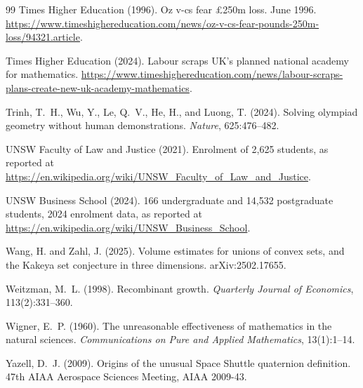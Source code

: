 \documentclass[11pt]{article}
\theoremstyle{definition}
\theoremstyle{remark}
\begin{document}
\begin{thebibliography}{99}
Times Higher Education (1996).
\newblock Oz v-cs fear \pounds 250m loss.
 June 1996. \url{https://www.timeshighereducation.com/news/oz-v-cs-fear-pounds-250m-loss/94321.article}.

Times Higher Education (2024).
\newblock Labour scraps UK's planned national academy for mathematics.
\newblock \url{https://www.timeshighereducation.com/news/labour-scraps-plans-create-new-uk-academy-mathematics}.

Trinh, T.~H., Wu, Y., Le, Q.~V., He, H., and Luong, T. (2024).
\newblock Solving olympiad geometry without human demonstrations.
\newblock \emph{Nature}, 625:476--482.

UNSW Faculty of Law and Justice (2021).
\newblock Enrolment of 2{,}625 students, as reported at \url{https://en.wikipedia.org/wiki/UNSW_Faculty_of_Law_and_Justice}.

UNSW Business School (2024).
166 undergraduate and 14{,}532 postgraduate students, 2024 enrolment data, as reported at \url{https://en.wikipedia.org/wiki/UNSW_Business_School}.

Wang, H. and Zahl, J. (2025).
\newblock Volume estimates for unions of convex sets, and the Kakeya set conjecture in three dimensions.
\newblock arXiv:2502.17655.

Weitzman, M.~L. (1998).
\newblock Recombinant growth.
\newblock \emph{Quarterly Journal of Economics}, 113(2):331--360.

Wigner, E.~P. (1960).
\newblock The unreasonable effectiveness of mathematics in the natural sciences.
\newblock \emph{Communications on Pure and Applied Mathematics}, 13(1):1--14.

Yazell, D.~J. (2009).
\newblock Origins of the unusual Space Shuttle quaternion definition.
\newblock 47th AIAA Aerospace Sciences Meeting, AIAA 2009-43.

\end{thebibliography}
\end{document}
